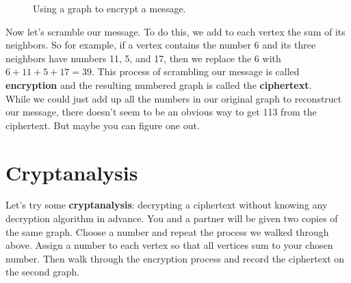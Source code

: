 \documentclass[12pt]{article}
\begin{document}
\begin{figure}
    \caption{Using a graph to encrypt a message.}%
\end{figure}
\noindent Now let's scramble our message. To do this, we add to each vertex the sum of its neighbors. So for example, if a vertex contains the number 6 and its three neighbors have numbers 11, 5, and 17, then we replace the 6 with $6+11+5+17 = 39$. This process of scrambling our message is called \textbf{encryption} and the resulting numbered graph is called the \textbf{ciphertext}.\\

\noindent While we could just add up all the numbers in our original graph to reconstruct our message, there doesn't seem to be an obvious way to get 113 from the ciphertext. But maybe you can figure one out.\\

\section*{Cryptanalysis}

\noindent Let's try some \textbf{cryptanalysis}: decrypting a ciphertext without knowing any decryption algorithm in advance. You and a partner will be given two copies of the same graph. Choose a number and repeat the process we walked through above. Assign a number to each vertex so that all vertices sum to your chosen number. Then walk through the encryption process and record the ciphertext on the second graph.\\
\end{document}
